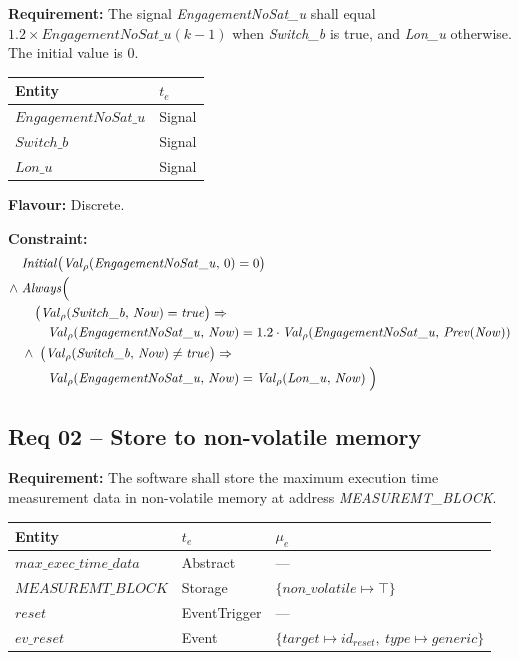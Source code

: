 \textbf{Requirement:} The signal \textit{EngagementNoSat\_u} shall equal $1.2 \times \mathit{EngagementNoSat\_u}(k{-}1)$ when \textit{Switch\_b} is true, and \textit{Lon\_u} otherwise. The initial value is 0.

\medskip

\begin{center}
\begin{tabular}{ll}
    \toprule
    \textbf{Entity} & $t_e$ \\
    \midrule
    $\mathit{EngagementNoSat\_u}$ & Signal \\
    $\mathit{Switch\_b}$ & Signal \\
    $\mathit{Lon\_u}$ & Signal \\
    \bottomrule
\end{tabular}
\end{center}

\textbf{Flavour:} Discrete.

\textbf{Constraint:}
\begin{align*}
    &\mathit{Initial}\bigl(\mathit{Val}_\rho(\mathit{EngagementNoSat\_u},\, 0) = 0\bigr) \\
    \land\; &\mathit{Always}\Bigl(\\
    &\quad \bigl(\mathit{Val}_\rho(\mathit{Switch\_b},\, \mathit{Now}) = \mathit{true}\bigr) \Rightarrow {} \\
    &\qquad \mathit{Val}_\rho(\mathit{EngagementNoSat\_u},\, \mathit{Now}) = 1.2 \cdot \mathit{Val}_\rho(\mathit{EngagementNoSat\_u},\, \mathit{Prev}(\mathit{Now}))\\
    &\land\; \bigl(\mathit{Val}_\rho(\mathit{Switch\_b},\, \mathit{Now}) \neq \mathit{true}\bigr) \Rightarrow {} \\
    &\qquad \mathit{Val}_\rho(\mathit{EngagementNoSat\_u},\, \mathit{Now}) = \mathit{Val}_\rho(\mathit{Lon\_u},\, \mathit{Now})
    \;\Bigr)
\end{align*}

\subsection{Req 02 -- Store to non-volatile memory}

\textbf{Requirement:} The software shall store the maximum execution time measurement data in non-volatile memory at address \textit{MEASUREMT\_BLOCK}.

\medskip

\begin{center}
\begin{tabular}{lll}
    \toprule
    \textbf{Entity} & $t_e$ & $\mu_e$ \\
    \midrule
    $\mathit{max\_exec\_time\_data}$ & Abstract & --- \\
    $\mathit{MEASUREMT\_BLOCK}$ & Storage & $\{\mathit{non\_volatile} \mapsto \top\}$ \\
    $\mathit{reset}$ & EventTrigger & --- \\
    $\mathit{ev\_reset}$ & Event & $\{\mathit{target} \mapsto id_{\mathit{reset}},\ \mathit{type} \mapsto \mathit{generic}\}$ \\
    \bottomrule
\end{tabular}
\end{center}

